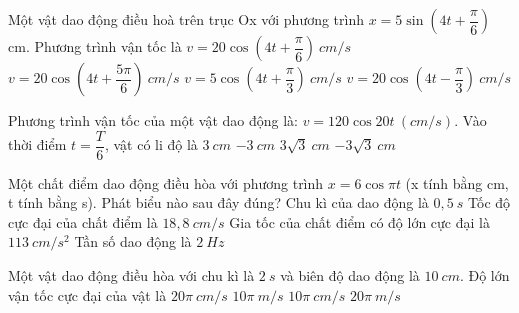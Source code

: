 \begin{ex}%
Một vật dao động điều hoà trên trục Ox với phương trình  $x=5\sin \left( 4t+\dfrac{\pi}{6} \right)$ cm. Phương trình vận tốc là
\choice
{\True $v=20\cos \left(4t+\dfrac{\pi}{6}\right)\ cm/s$}
{$v=20\cos \left(4t+\dfrac{5\pi}{6}\right)\ cm/s$}
{$v=5\cos \left(4t+\dfrac{\pi}{3}\right)\ cm/s$}
{$v=20\cos \left(4t-\dfrac{\pi}{3}\right)\ cm/s$}
\end{ex} 
\begin{ex}%
Phương trình vận tốc của một vật dao động là: $v=120\cos 20t\ (cm/s)$. Vào thời điểm $t=\dfrac{T}{6}$, vật có li độ là
\choice
{$3\ cm$}
{$-3\ cm$}
{\True $3\sqrt 3\ cm$}
{$-3\sqrt 3\ cm$}
\end{ex} 
\begin{ex}%
Một chất điểm dao động điều hòa với phương trình $x = 6\cos\pi t$ (x tính bằng cm, t tính bằng s). Phát biểu nào sau đây đúng?
\choice
{Chu kì của dao động là $0,5\ s$}
{\True Tốc độ cực đại của chất điểm là $18,8\ cm/s$}
{Gia tốc của chất điểm có độ lớn cực đại là $113\ cm/s^2$}
{Tần số dao động là $2\ Hz$}
\end{ex} 
\begin{ex}
Một vật dao động điều hòa với chu kì là $2\ s$ và biên độ dao động là $10\ cm$. Độ lớn vận tốc cực đại của vật là
\choice
{$20\pi\ cm/s$}
{$10\pi\ m/s$}
{\True $10\pi\ cm/s$}
{$20\pi\ m/s$}
\end{ex}
